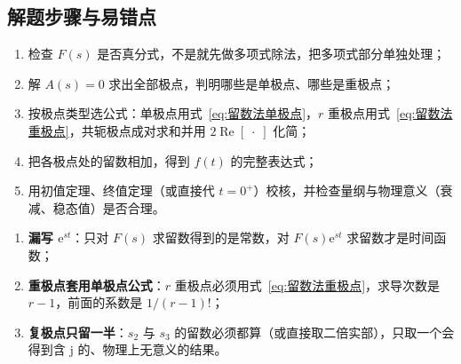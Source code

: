 \subsection{解题步骤与易错点}

\begin{tipbox}[留数法解题步骤]
\begin{enumerate}
\item 检查 $F(s)$ 是否真分式，不是就先做多项式除法，把多项式部分单独处理；
\item 解 $A(s)=0$ 求出全部极点，判明哪些是单极点、哪些是重极点；
\item 按极点类型选公式：单极点用式~\eqref{eq:留数法单极点}，$r$ 重极点用式~\eqref{eq:留数法重极点}，共轭极点成对求和并用 $2\operatorname{Re}\left[\;\cdot\;\right]$ 化简；
\item 把各极点处的留数相加，得到 $f(t)$ 的完整表达式；
\item 用初值定理、终值定理（或直接代 $t=0^{+}$）校核，并检查量纲与物理意义（衰减、稳态值）是否合理。
\end{enumerate}
\end{tipbox}

\begin{warnbox}[三个易错点]
\begin{enumerate}
\item \textbf{漏写 $\mathrm{e}^{st}$}：只对 $F(s)$ 求留数得到的是常数，对 $F(s)\mathrm{e}^{st}$ 求留数才是时间函数；
\item \textbf{重极点套用单极点公式}：$r$ 重极点必须用式~\eqref{eq:留数法重极点}，求导次数是 $r-1$，前面的系数是 $1/(r-1)!$；
\item \textbf{复极点只留一半}：$s_2$ 与 $s_3$ 的留数必须都算（或直接取二倍实部），只取一个会得到含 $\mathrm{j}$ 的、物理上无意义的结果。
\end{enumerate}
\end{warnbox}
